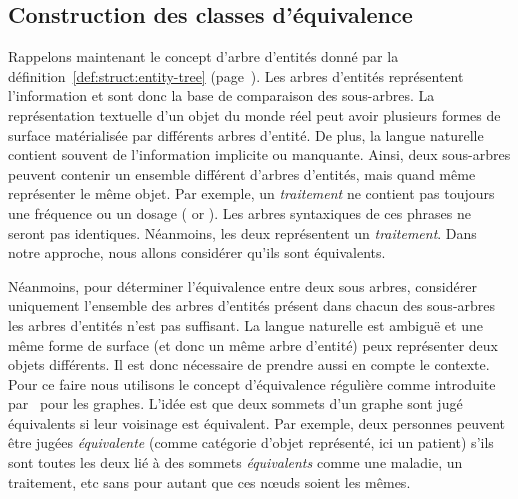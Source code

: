 \subsection{Construction des classes d'équivalence}
Rappelons maintenant le concept d'arbre d'entités donné par la définition~\ref{def:struct:entity-tree} (page~\pageref{def:struct:entity-tree}).
Les arbres d'entités représentent l'information et sont donc la base de comparaison des sous-arbres.
La représentation textuelle d'un objet du monde réel peut avoir plusieurs formes de surface matérialisée par différents arbres d'entité.
De plus, la langue naturelle contient souvent de l'information implicite ou manquante.
Ainsi, deux sous-arbres peuvent contenir un ensemble différent d'arbres d'entités, mais quand même représenter le même objet.
Par exemple, un \emph{traitement} ne contient pas toujours une fréquence ou un dosage ( or ).
Les arbres syntaxiques de ces phrases ne seront pas identiques.
Néanmoins, les deux représentent un \emph{traitement}.
Dans notre approche, nous allons considérer qu'ils sont équivalents.

Néanmoins, pour déterminer l'équivalence entre deux sous arbres, considérer uniquement l'ensemble des arbres d'entités présent dans chacun des sous-arbres les arbres d'entités n'est pas suffisant.
La langue naturelle est ambiguë et une même forme de surface (et donc un même arbre d'entité) peux représenter deux objets différents.
Il est donc nécessaire de prendre aussi en compte le contexte.
Pour ce faire nous utilisons le concept d'équivalence régulière comme introduite par~\cite{whiteGraphSemigroupHomomorphisms1983} pour les graphes.
L'idée est que deux sommets d'un graphe sont jugé équivalents si leur voisinage est équivalent.
Par exemple, deux personnes peuvent être jugées \emph{équivalente} (comme catégorie d'objet représenté, ici un patient) s'ils sont toutes les deux lié à des sommets \emph{équivalents} comme une maladie, un traitement, etc sans pour autant que ces nœuds soient les mêmes.

